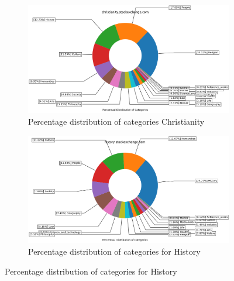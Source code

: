 \begin{figure}[H]
\ContinuedFloat
\begin{subfigure}{0.9\textwidth}
    \centering
        \includegraphics[width=1\linewidth]{imgs/percentual-distribution/christianity_stackexchange_com_donut}
        \caption{Percentage distribution of categories Christianity}
        \label{fig:percentage-distribution-christianity}
    \end{subfigure}
    
     	\par\bigskip %
    \par\bigskip %
        
     \begin{subfigure}{0.9\textwidth}
    \centering
        \includegraphics[width=1\linewidth]{imgs/percentual-distribution/history_stackexchange_com_donut}
        \caption{Percentage distribution of categories for History}
        \label{fig:percentage-distribution-history}
    \end{subfigure}%
    

\end{figure}
